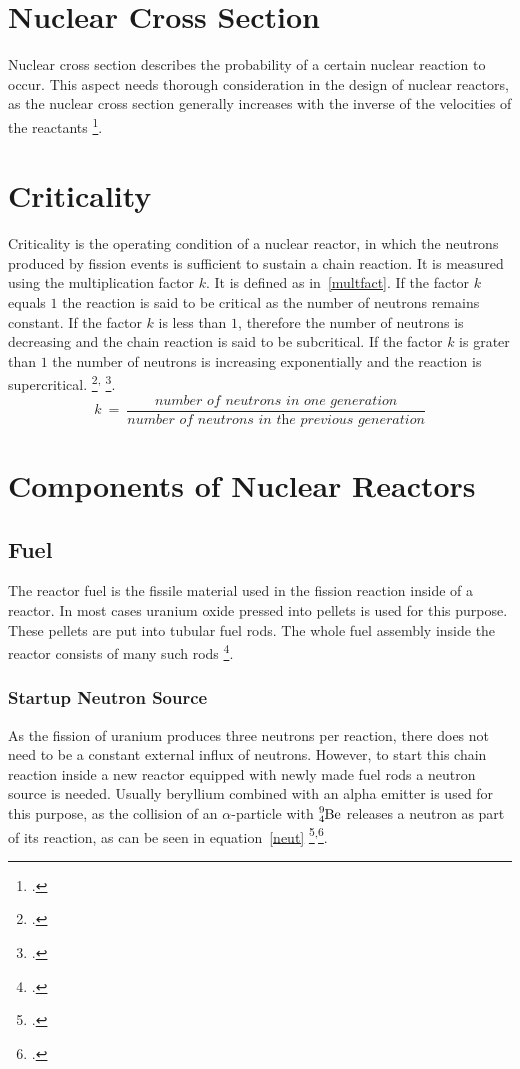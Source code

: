 \section{Nuclear Cross Section}
Nuclear cross section describes the probability of a certain nuclear reaction to occur. This
aspect needs thorough consideration in the design of nuclear reactors, as the nuclear cross section
generally increases with the inverse of the velocities of the reactants \footcite[108]{nucfundamentals}.

\section{Criticality}
Criticality is the operating condition of a nuclear reactor, in which the neutrons produced by fission
events is sufficient to sustain a chain reaction. It is measured using the multiplication factor
$k$. It is defined as in~\ref{multfact}. If the factor $k$ equals $1$ the reaction is said to be
critical as the number of neutrons remains constant. If the factor $k$ is less than $1$, therefore
the number of neutrons is decreasing and the chain reaction is said to be subcritical. If the factor
$k$ is grater than $1$ the number of neutrons is increasing exponentially and the reaction is supercritical.
\footcite[308]{nucfundamentals}\textsuperscript{,} \footcite[39]{ReactorPhysics}.
\begin{equation}
    \label{multfact}
    k~=~\frac{\textit{number of neutrons in one generation}}{\textit{number of neutrons in the previous generation}}
\end{equation}

\section{Components of Nuclear Reactors}
\subsection{Fuel}
The reactor fuel is the fissile material used in the fission reaction inside of a reactor. In
most cases uranium oxide  pressed into pellets is used for this purpose. These
pellets are put into tubular fuel rods. The whole fuel assembly inside the reactor consists of many
such rods \footcite{WNPR}.
\subsubsection{Startup Neutron Source}
As the fission of uranium produces three neutrons per reaction, there does not need to be
a constant external influx of neutrons. However, to start this chain reaction inside a new reactor
equipped with newly made fuel rods a neutron source is needed. Usually beryllium combined with an
alpha emitter is used for this purpose, as the collision of an $\alpha$-particle with $\ce{^{9}_{4}Be}$
releases a neutron as part of its reaction, as can be seen in equation~\ref{neut} \footcite{WNPR}\textsuperscript{,}\footcite[100]{nucfundamentals}.

